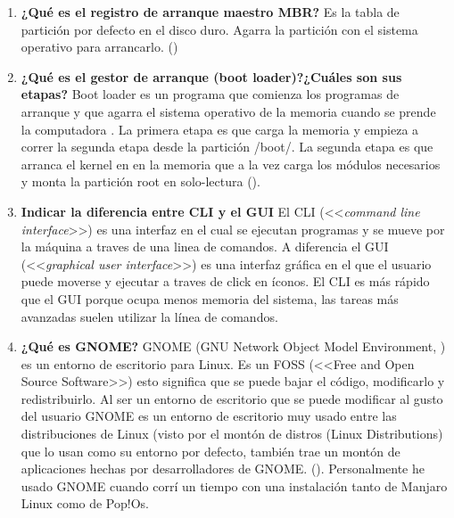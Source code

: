 \documentclass[stu, 12pt, letterpaper, donotrepeattitle, floatsintext, natbib, helv]{apa7}
\begin{document}
\begin{enumerate}
    \item \textbf{¿Qué es el registro de arranque maestro MBR?}
    Es la tabla de partición por defecto en el disco duro. Agarra la partición con el sistema operativo para arrancarlo. (\cite{MBR})

    \item \textbf{¿Qué es el gestor de arranque (boot loader)?¿Cuáles son sus etapas?}
    Boot loader es un programa que comienza los programas de arranque y que agarra el sistema operativo de la memoria cuando se prende la computadora . La primera etapa es que carga la memoria y empieza a correr la segunda etapa desde la partición /boot/. La segunda etapa es que arranca el kernel en en la memoria que a la vez carga los módulos necesarios y monta la partición root en solo-lectura (\cite{bootloaderArranque}).
    

    \item \textbf{Indicar la diferencia entre CLI y el GUI}
    El CLI (<<\textit{command line interface}>>) es una interfaz en el cual se ejecutan programas y se mueve por la máquina a traves de una linea de comandos. A diferencia el GUI (<<\textit{graphical user interface}>>) es una interfaz gráfica en el que el usuario puede moverse y ejecutar a traves de click en íconos. El CLI es más rápido que el GUI porque ocupa menos memoria del sistema, las tareas más avanzadas suelen utilizar la línea de comandos. 

    \item \textbf{¿Qué es GNOME?}
    GNOME (GNU Network Object Model Environment, \cite{GNOME1}) es un entorno de escritorio para Linux. Es un FOSS (<<Free and Open Source Software>>) esto significa que se puede bajar el código, modificarlo y redistribuirlo. Al ser un entorno de escritorio que se puede modificar al gusto del usuario GNOME es un entorno de escritorio muy usado entre las distribuciones de Linux (visto por el montón de distros (Linux Distributions) que lo usan como su entorno por defecto, también trae un montón de aplicaciones hechas por desarrolladores de GNOME. (\cite{GNOME}). Personalmente he usado GNOME cuando corrí un tiempo con una instalación tanto de Manjaro Linux como de Pop!Os.


\end{enumerate}
\end{document}
